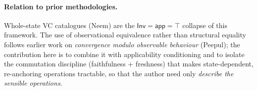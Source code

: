 \documentclass[11pt]{article}
\newcommand{\Inv}{\mathsf{Inv}}
\newcommand{\app}{\mathsf{app}}
\begin{document}
\paragraph{Relation to prior methodologies.} Whole-state VC catalogues (Neem)
are the $\Inv=\app=\top$ collapse of this framework. The use of observational
equivalence rather than structural equality follows earlier work on
\emph{convergence modulo observable behaviour} (Peepul); the contribution here is
to combine it with applicability conditioning and to isolate the commutation
discipline (faithfulness + freshness) that makes state-dependent, re-anchoring
operations tractable, so that the author need only \emph{describe the sensible
operations}.
\end{document}
